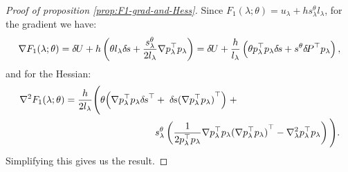 \documentclass[smallcondensed]{svjour3}
\begin{document}
\begin{proof}[Proof of proposition \ref{prop:F1-grad-and-Hess}]
  Since
  $F_1(\lambda; \theta) = u_\lambda + h s^{\theta}_\lambda l_\lambda$,
  for the gradient we have:
  \begin{equation*}
    \nabla F_1(\lambda; \theta) = {\delta \hspace{-0.09em} U} + h \left(\theta l_\lambda {\delta \hspace{-0.1em} s} + \frac{s^{\theta}_\lambda}{2l_\lambda} \nabla p_\lambda^\top p_\lambda\right) = {\delta \hspace{-0.09em} U} + \frac{h}{l_\lambda} \left(\theta p_\lambda^\top p_\lambda {\delta \hspace{-0.1em} s} + s^{\theta} {\delta \hspace{-0.14em} P}^\top p_\lambda\right),
  \end{equation*}
  and for the Hessian:
  \begin{equation*}
    \begin{aligned}
      \nabla^2 F_1(\lambda; \theta) = \frac{h}{2 l_\lambda} \Bigg(\theta \Big(\nabla p_\lambda^\top p_\lambda {\delta \hspace{-0.1em} s}^\top &+\; {\delta \hspace{-0.1em} s} {(\nabla p_\lambda^\top p_\lambda)}^\top\Big) \;+ \\
      &s^{\theta}_\lambda \left(\frac{1}{2 p_\lambda^\top p_\lambda} \nabla p_\lambda^\top p_\lambda {(\nabla p_\lambda^\top p_\lambda)}^\top - \nabla^2_\lambda p_\lambda^\top p_\lambda\right) \Bigg).
    \end{aligned}
  \end{equation*}
  Simplifying this gives us the result.
\end{proof}
\end{document}
